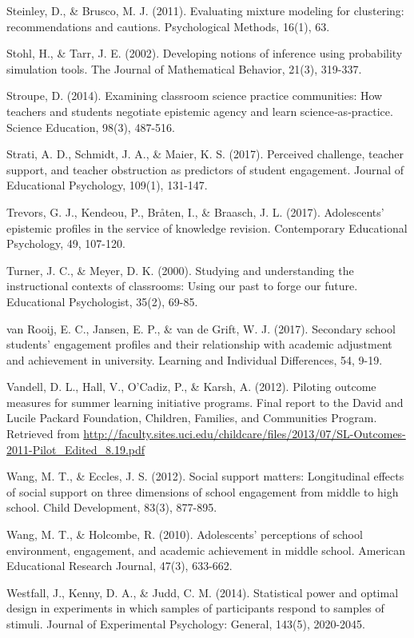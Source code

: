\documentclass[]{book}
\theoremstyle{definition}
\theoremstyle{definition}
\theoremstyle{definition}
\theoremstyle{remark}
\begin{document}
Steinley, D., \& Brusco, M. J. (2011). Evaluating mixture modeling for
clustering: recommendations and cautions. Psychological Methods, 16(1),
63.

Stohl, H., \& Tarr, J. E. (2002). Developing notions of inference using
probability simulation tools. The Journal of Mathematical Behavior,
21(3), 319-337.

Stroupe, D. (2014). Examining classroom science practice communities:
How teachers and students negotiate epistemic agency and learn
science‐as‐practice. Science Education, 98(3), 487-516.

Strati, A. D., Schmidt, J. A., \& Maier, K. S. (2017). Perceived
challenge, teacher support, and teacher obstruction as predictors of
student engagement. Journal of Educational Psychology, 109(1), 131-147.

Trevors, G. J., Kendeou, P., Bråten, I., \& Braasch, J. L. (2017).
Adolescents' epistemic profiles in the service of knowledge revision.
Contemporary Educational Psychology, 49, 107-120.

Turner, J. C., \& Meyer, D. K. (2000). Studying and understanding the
instructional contexts of classrooms: Using our past to forge our
future. Educational Psychologist, 35(2), 69-85.

van Rooij, E. C., Jansen, E. P., \& van de Grift, W. J. (2017).
Secondary school students' engagement profiles and their relationship
with academic adjustment and achievement in university. Learning and
Individual Differences, 54, 9-19.

Vandell, D. L., Hall, V., O'Cadiz, P., \& Karsh, A. (2012). Piloting
outcome measures for summer learning initiative programs. Final report
to the David and Lucile Packard Foundation, Children, Families, and
Communities Program. Retrieved from
\url{http://faculty.sites.uci.edu/childcare/files/2013/07/SL-Outcomes-2011-Pilot_Edited_8.19.pdf}

Wang, M. T., \& Eccles, J. S. (2012). Social support matters:
Longitudinal effects of social support on three dimensions of school
engagement from middle to high school. Child Development, 83(3),
877-895.

Wang, M. T., \& Holcombe, R. (2010). Adolescents' perceptions of school
environment, engagement, and academic achievement in middle school.
American Educational Research Journal, 47(3), 633-662.

Westfall, J., Kenny, D. A., \& Judd, C. M. (2014). Statistical power and
optimal design in experiments in which samples of participants respond
to samples of stimuli. Journal of Experimental Psychology: General,
143(5), 2020-2045.
\end{document}
